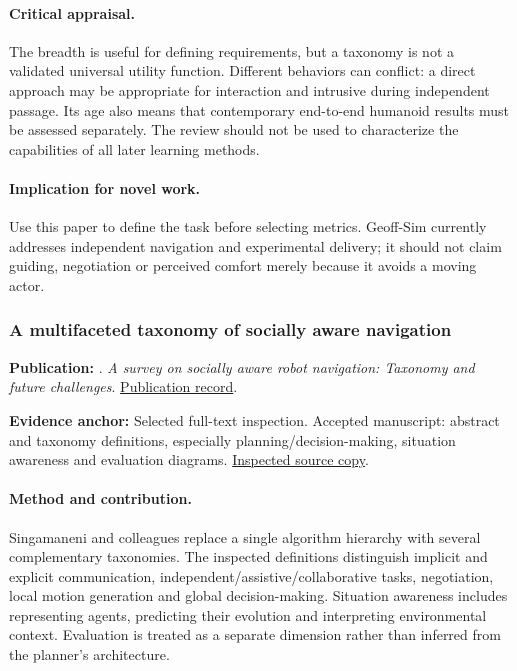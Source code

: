 \paragraph{Critical appraisal.} The breadth is useful for defining requirements, but a taxonomy is not a validated universal utility function. Different behaviors can conflict: a direct approach may be appropriate for interaction and intrusive during independent passage. Its age also means that contemporary end-to-end humanoid results must be assessed separately. The review should not be used to characterize the capabilities of all later learning methods.

\paragraph{Implication for novel work.} Use this paper to define the task before selecting metrics. Geoff-Sim currently addresses independent navigation and experimental delivery; it should not claim guiding, negotiation or perceived comfort merely because it avoids a moving actor.

\subsubsection{A multifaceted taxonomy of socially aware navigation}\label{paper:survey2024}
\textbf{Publication:} \citet{survey2024}. \emph{A survey on socially aware robot navigation: Taxonomy and future challenges}. \href{https://doi.org/10.1177/02783649241230562}{Publication record}.

\textbf{Evidence anchor:} Selected full-text inspection. Accepted manuscript: abstract and taxonomy definitions, especially planning/decision-making, situation awareness and evaluation diagrams. \href{https://publications.aston.ac.uk/id/eprint/46055/1/Singamaneni_et_al_AAM_2311.06922_Survey_on_Socially_Aware_Robot_Navigation_taxonomy_and_future_challenges.pdf}{Inspected source copy}.

\paragraph{Method and contribution.} Singamaneni and colleagues replace a single algorithm hierarchy with several complementary taxonomies. The inspected definitions distinguish implicit and explicit communication, independent/assistive/collaborative tasks, negotiation, local motion generation and global decision-making. Situation awareness includes representing agents, predicting their evolution and interpreting environmental context. Evaluation is treated as a separate dimension rather than inferred from the planner's architecture.

